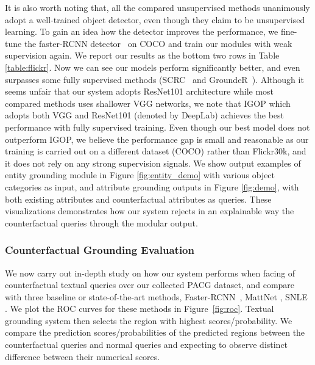 It is also worth noting that, all the compared unsupervised methods unanimously adopt a well-trained object detector, even though they claim to be unsupervised learning.
To gain an idea how the detector improves the performance,
we fine-tune the faster-RCNN detector~\citep{girshick2015fast} on COCO
and train our modules with weak supervision again.
We report our results as the bottom two rows in Table \ref{table:flickr}.
Now we can see our models perform significantly better, and even surpasses some fully supervised methods (SCRC~\citep{hu2016natural}
and GroundeR~\citep{rohrbach2016grounding}).
Although it seems unfair that our system adopts ResNet101 architecture
while most compared methods uses shallower VGG networks,
we note that IGOP which adopts both VGG and ResNet101 (denoted by DeepLab) 
achieves the best performance with fully supervised training.
Even though our best model does not outperform IGOP,
we believe the performance gap is small and reasonable as our training is carried out
on a different dataset (COCO) rather than Flickr30k, and it does not
rely on any strong supervision signals. We show output examples of entity grounding module in Figure \ref{fig:entity_demo} with various object categories as input, and attribute grounding outputs in Figure \ref{fig:demo}, with both existing attributes and counterfactual attributes as queries. These visualizations demonstrates how our system rejects  in an explainable way the counterfactual queries through the modular output.

\subsubsection{Counterfactual Grounding Evaluation}
We now carry out in-depth study on how our system performs when facing of counterfactual textual queries over our collected
PACG dataset, and compare with three baseline or state-of-the-art methods, Faster-RCNN~\citep{ren2015faster}, MattNet \citep{yu2018mattnet}, SNLE \citep{hu2016segmentation}. We plot the ROC curves for these methods in Figure~\ref{fig:roc}. Textual grounding system then selects the region with highest scores/probability. We compare the prediction scores/probabilities of the predicted regions between the counterfactual queries and normal queries and expecting to observe distinct difference between their numerical scores.

